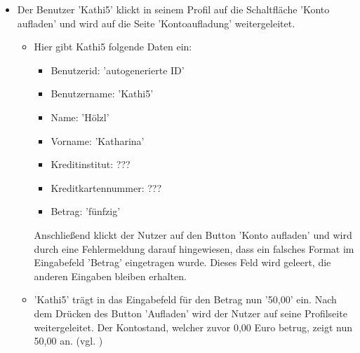 \documentclass[a4paper]{scrreprt}
\begin{document}
\begin{itemize}
			\item {} 
			Der Benutzer 'Kathi5' klickt in seinem Profil auf die Schaltfläche 'Konto aufladen' und wird auf die Seite 'Kontoaufladung' weitergeleitet. 
				\begin{itemize}
					\item Hier gibt Kathi5 folgende Daten ein:
						 \begin{itemize}
						 	\item Benutzerid: 'autogenerierte ID'
						 	\item Benutzername: 'Kathi5'
						 	\item Name: 'Hölzl'
						 	\item Vorname: 'Katharina'
						 	\item Kreditinstitut: ???
						 	\item Kreditkartennummer: ???
						 	\item Betrag: 'fünfzig'
						 \end{itemize}
					Anschließend klickt der Nutzer auf den Button 'Konto aufladen' und wird durch eine Fehlermeldung darauf hingewiesen, dass ein falsches Format im Eingabefeld 'Betrag' eingetragen wurde. Dieses Feld wird geleert, die anderen Eingaben bleiben erhalten.
						
					\item 'Kathi5' trägt in das Eingabefeld für den Betrag nun '50,00' ein. Nach dem Drücken des Button 'Aufladen' wird der Nutzer auf seine Profilseite weitergeleitet. Der Kontostand, welcher zuvor 0,00 Euro betrug, zeigt nun 50,00 an.  (vgl. )
				\end{itemize}
			\end{itemize}
			
\end{document}
